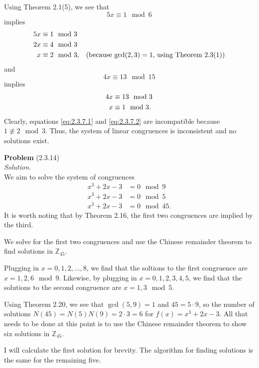 \documentclass[12 pt]{amsart}
\begin{document}
  Using Theorem 2.1(5), we see that
  \[
    5x \equiv 1 \mod 6
  \]
  implies
  \begin{align}
    5x &\equiv 1 \mod 3  \notag \\
    2x &\equiv 4 \mod 3 \notag \\ 
    x  &\equiv 2 \mod 3, 
      & \text{(because $\gcd(2, 3) = 1$, using Theorem 2.3(1))} 
        \label{eq:2.3.7.1}
  \end{align}
  and 
  \[
    4x \equiv 13 \mod 15
  \]
  implies 
  \begin{align}
    4x &\equiv 13 \mod 3 \notag \\
    x &\equiv 1 \mod 3. \label{eq:2.3.7.2}
  \end{align}
  Clearly, equations \ref{eq:2.3.7.1} and \ref{eq:2.3.7.2} 
  are incompatible because $1 \not \equiv 2 \mod 3$. 
  Thus, the system of linear congruences is inconsistent
  and no solutions exist. 
\vfill
\newpage



\phantom{\quad} \vfill
\noindent
\textbf{Problem} (2.3.14) \\[4ex]
\emph{Solution.} \\[2ex]
  We aim to solve the system of congruences
  \begin{align*}
    x^3 + 2x - 3 &= 0 \mod 9 \\
    x^3 + 2x - 3 &= 0 \mod 5 \\
    x^3 + 2x - 3 &= 0 \mod 45.
  \end{align*}
  It is worth noting that by Theorem 2.16, 
  the first two congruences are implied by the third.

  We solve for the first two congruences and 
  use the Chinese remainder theorem to find solutions
  in $\mathbb{Z}_{45}$.

  Plugging in $x = 0, 1, 2, \ldots, 8$, we find that
  the soltions to the first congruence are
  $x = 1,2,6 \mod 9$.
  Likewise, by plugging in $x = 0, 1, 2, 3, 4, 5$, 
  we find that the solutions to the second congruence
  are $x = 1, 3 \mod 5$.

  Using Theorem 2.20, we see that $\gcd(5,9) = 1$ and
  $45 = 5 \cdot 9$, so the number of solutions 
  $N(45) = N(5)N(9) = 2 \cdot 3 = 6$ 
  for $f(x) = x^3 + 2x - 3$.
  All that needs to be done at this point is to use
  the Chinese remainder theorem to show six solutions
  in $\mathbb{Z}_{45}$.

  I will calculate the first solution for brevity.
  The algorithm for finding solutions is the same
  for the remaining five. 
\end{document}
